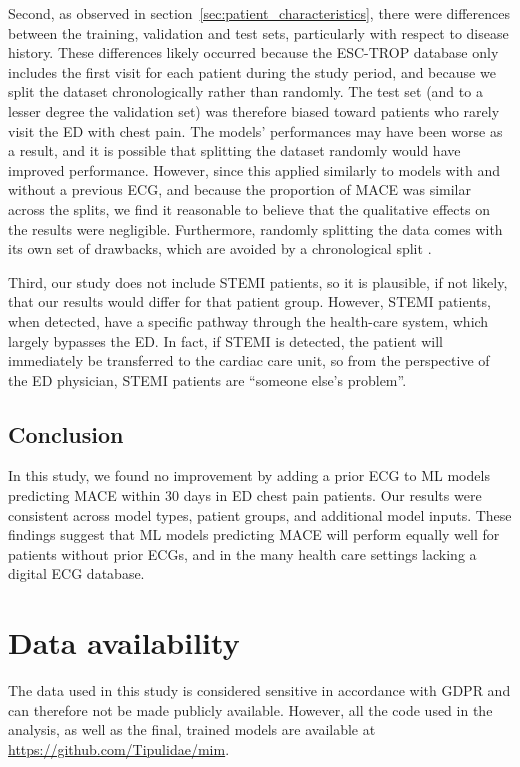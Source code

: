 \documentclass[preprint]{elsarticle}
\begin{document}
Second, as observed in section~\ref{sec:patient_characteristics}, there were differences between the training, validation and test sets, particularly with respect to disease history. These differences likely occurred because the ESC-TROP database only includes the first visit for each patient during the study period, and because we split the dataset chronologically rather than randomly. The test set (and to a lesser degree the validation set) was therefore biased toward patients who rarely visit the ED with chest pain. The models' performances may have been worse as a result, and it is possible that splitting the dataset randomly would have improved performance. However, since this applied similarly to models with and without a previous ECG, and because the proportion of MACE was similar across the splits, we find it reasonable to believe that the qualitative effects on the results were negligible. Furthermore, randomly splitting the data comes with its own set of drawbacks, which are avoided by a chronological split \citep{steyerberg2009}.

Third, our study does not include STEMI patients, so it is plausible, if not likely, that our results would differ for that patient group. However, STEMI patients, when detected, have a specific pathway through the health-care system, which largely bypasses the ED. In fact, if STEMI is detected, the patient will immediately be transferred to the cardiac care unit, so from the perspective of the ED physician, STEMI patients are ``someone else's problem''.
\subsection{Conclusion}
In this study, we found no improvement by adding a prior ECG to ML models predicting MACE within 30 days in ED chest pain patients. Our results were consistent across model types, patient groups, and additional model inputs. These findings suggest that ML models predicting MACE will perform equally well for patients without prior ECGs, and in the many health care settings lacking a digital ECG database.

\section*{Data availability}
The data used in this study is considered sensitive in accordance with GDPR and can therefore not be made publicly available. However, all the code used in the analysis, as well as the final, trained models are available at \url{https://github.com/Tipulidae/mim}. 
\end{document}
